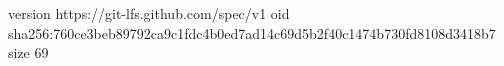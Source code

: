 version https://git-lfs.github.com/spec/v1
oid sha256:760ce3beb89792ca9c1fdc4b0ed7ad14c69d5b2f40c1474b730fd8108d3418b7
size 69
